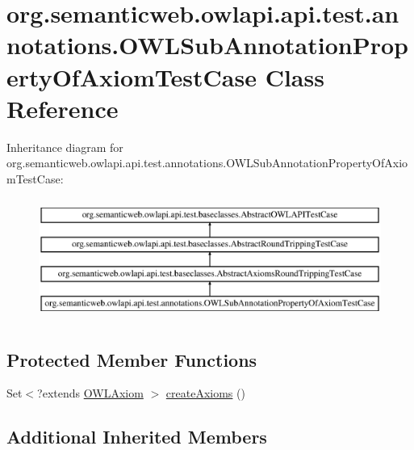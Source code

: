 \hypertarget{classorg_1_1semanticweb_1_1owlapi_1_1api_1_1test_1_1annotations_1_1_o_w_l_sub_annotation_property_of_axiom_test_case}{\section{org.\-semanticweb.\-owlapi.\-api.\-test.\-annotations.\-O\-W\-L\-Sub\-Annotation\-Property\-Of\-Axiom\-Test\-Case Class Reference}
\label{classorg_1_1semanticweb_1_1owlapi_1_1api_1_1test_1_1annotations_1_1_o_w_l_sub_annotation_property_of_axiom_test_case}
}
Inheritance diagram for org.\-semanticweb.\-owlapi.\-api.\-test.\-annotations.\-O\-W\-L\-Sub\-Annotation\-Property\-Of\-Axiom\-Test\-Case\-:\begin{figure}[H]
\begin{center}
\leavevmode
\includegraphics[height=4.000000cm]{classorg_1_1semanticweb_1_1owlapi_1_1api_1_1test_1_1annotations_1_1_o_w_l_sub_annotation_property_of_axiom_test_case}
\end{center}
\end{figure}
\subsection*{Protected Member Functions}
\begin{DoxyCompactItemize}
\item 
Set$<$?extends \hyperlink{interfaceorg_1_1semanticweb_1_1owlapi_1_1model_1_1_o_w_l_axiom}{O\-W\-L\-Axiom} $>$ \hyperlink{classorg_1_1semanticweb_1_1owlapi_1_1api_1_1test_1_1annotations_1_1_o_w_l_sub_annotation_property_of_axiom_test_case_a162148e8f615a6ad0b9f3b35cd45c1a5}{create\-Axioms} ()
\end{DoxyCompactItemize}
\subsection*{Additional Inherited Members}


